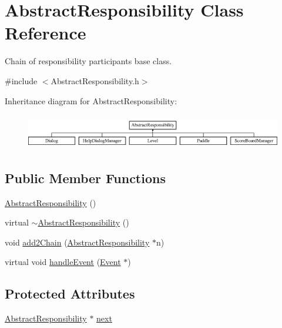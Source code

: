 \hypertarget{classAbstractResponsibility}{\section{Abstract\-Responsibility Class Reference}
\label{classAbstractResponsibility}
}


Chain of responsibility participants base class.  




{\ttfamily \#include $<$Abstract\-Responsibility.\-h$>$}

Inheritance diagram for Abstract\-Responsibility\-:\begin{figure}[H]
\begin{center}
\leavevmode
\includegraphics[height=1.555556cm]{classAbstractResponsibility}
\end{center}
\end{figure}
\subsection*{Public Member Functions}
\begin{DoxyCompactItemize}
\item 
\hyperlink{classAbstractResponsibility_ab11b9ec178012c0ab361ef4abe8be9e9}{Abstract\-Responsibility} ()
\item 
virtual \hyperlink{classAbstractResponsibility_af7ae360c861e5ba2e9024c830a3526c5}{$\sim$\-Abstract\-Responsibility} ()
\item 
void \hyperlink{classAbstractResponsibility_a9108e8a0a63112ef3077da388ed19eba}{add2\-Chain} (\hyperlink{classAbstractResponsibility}{Abstract\-Responsibility} $\ast$n)
\item 
virtual void \hyperlink{classAbstractResponsibility_a14d885884ae4841dbe7c5824b986f2c9}{handle\-Event} (\hyperlink{classEvent}{Event} $\ast$)
\end{DoxyCompactItemize}
\subsection*{Protected Attributes}
\begin{DoxyCompactItemize}
\item 
\hyperlink{classAbstractResponsibility}{Abstract\-Responsibility} $\ast$ \hyperlink{classAbstractResponsibility_a2af04f271483fd99267d5f6205ec257f}{next}
\end{DoxyCompactItemize}
